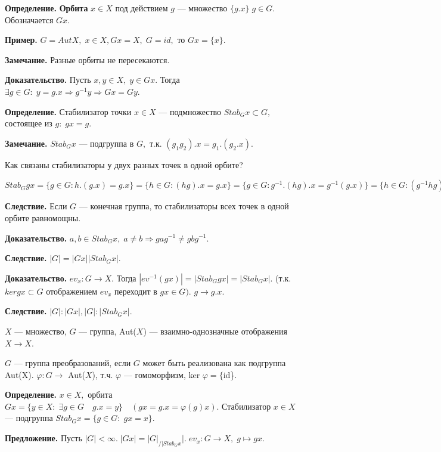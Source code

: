 \documentclass[12pt,a4paper]{article}
\begin{document}
\textbf{Определение.} \textbf{Орбита} $x \in X$ под действием $g$ --- множество $\{g.x\} \; g \in G.$ Обозначается $Gx.$ 

\textbf{Пример.} $G = Aut X, \; x \in X, Gx = X, \; G = id,$ то $Gx = \{x\}.$

\textbf{Замечание.} Разные орбиты не пересекаются. 

\textbf{Доказательство.} Пусть $x, y \in X, \; y \in Gx.$ Тогда $\exists g \in G: \; y = g.x \Rightarrow g^{-1}y \Rightarrow Gx = Gy.$

\textbf{Определение.} Стабилизатор точки $x \in X$ --- подмножество $Stab_{G}x \subset G,$ состоящее из $g: \; gx = g.$

\textbf{Замечание.} $Stab_{G} x$ --- подгруппа в $G,$ т.к. $(g_{1}g_{2}).x = g_{1}.(g_{2}.x).$ 

Как связаны стабилизаторы у двух разных точек в одной орбите? 

$Stab_{G}gx = \{g \in G: h.(g.x) = g.x\} = \{h \in G: (hg).x = g.x\} = \{g \in G: g^{-1}.(hg).x = g^{-1}(g.x)\} = \{h \in G: (g^{-1}hg).x = x\} = \{h \in G: g^{-1}hg \in Stab_{G}x\} = \{h \in G: \; h \in g Stab_{G}(x)g^{-1}\}.$ 

\textbf{Следствие.} Если $G$ --- конечная группа, то стабилизаторы всех точек в одной орбите равномощны. 

\textbf{Доказательство.} $a, b \in Stab_{G}x, \; a \neq b \Rightarrow gag^{-1} \neq gbg^{-1}.$ 

\textbf{Следствие.} $|G| = |Gx||Stab_{G}x|.$ 

\textbf{Доказательство.} $ev_{x}: G \to X.$ Тогда $|ev^{-1} (gx)| = |Stab_{G}gx| = |Stab_{G}x|.$ (т.к. $ker gx \subset G$ отображением $ev_{x}$ переходит в $gx \in G).$ $g \to g.x.$

\textbf{Следствие.} $|G|: |Gx|, |G|: |Stab_{G}x|.$  

$X$ --- множество, $G$ --- группа, Aut($X$) --- взаимно-однозначные отображения $X \to X.$ 

$G$ --- группа преобразований, если $G$ может быть реализована как подгруппа Aut(X). $\varphi: G \to$ Aut($X$), т.ч. $\varphi$ --- гомоморфизм, ker $\varphi = \{$id\}. 

\textbf{Определение.} $x \in X,$ орбита $Gx = \{y \in X: \; \exists g \in G \quad g.x = y\} \quad (gx = g.x = \varphi(g)x).$ Стабилизатор $x \in X$ --- подгруппа $Stab_{G}x = \{g \in G: \; gx = x\}.$ 

\textbf{Предложение.} Пусть $|G| < \infty. \; |Gx| = |G|_{/|Stab_{G}x}|. \; ev_{x}: G \to X, \; g \mapsto gx.$ 
\end{document}
